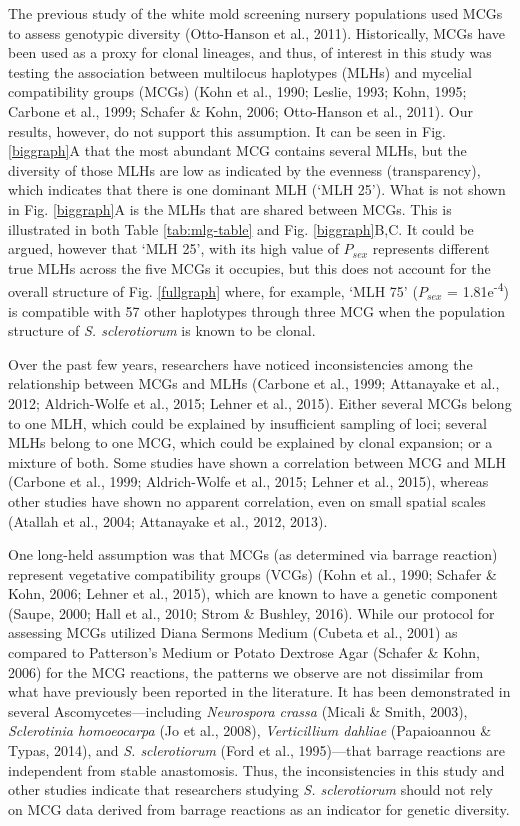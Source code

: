 The previous study of the white mold screening nursery populations used
MCGs to assess genotypic diversity (Otto-Hanson et al., 2011).
Historically, MCGs have been used as a proxy for clonal lineages, and
thus, of interest in this study was testing the association between
multilocus haplotypes (MLHs) and mycelial compatibility groups (MCGs)
(Kohn et al., 1990; Leslie, 1993; Kohn, 1995; Carbone et al., 1999;
Schafer \& Kohn, 2006; Otto-Hanson et al., 2011). Our results, however,
do not support this assumption. It can be seen in Fig. \ref{biggraph}A
that the most abundant MCG contains several MLHs, but the diversity of
those MLHs are low as indicated by the evenness (transparency), which
indicates that there is one dominant MLH (`MLH 25'). What is not shown
in Fig. \ref{biggraph}A is the MLHs that are shared between MCGs. This
is illustrated in both Table \ref{tab:mlg-table} and Fig.
\ref{biggraph}B,C. It could be argued, however that `MLH 25', with its
high value of \(P_{sex}\) represents different true MLHs across the five
MCGs it occupies, but this does not account for the overall structure of
Fig. \ref{fullgraph} where, for example, `MLH 75' (\(P_{sex}\) =
1.81e\textsuperscript{-4}) is compatible with 57 other haplotypes
through three MCG when the population structure of \emph{S.
sclerotiorum} is known to be clonal.

Over the past few years, researchers have noticed inconsistencies among
the relationship between MCGs and MLHs (Carbone et al., 1999; Attanayake
et al., 2012; Aldrich-Wolfe et al., 2015; Lehner et al., 2015). Either
several MCGs belong to one MLH, which could be explained by insufficient
sampling of loci; several MLHs belong to one MCG, which could be
explained by clonal expansion; or a mixture of both. Some studies have
shown a correlation between MCG and MLH (Carbone et al., 1999;
Aldrich-Wolfe et al., 2015; Lehner et al., 2015), whereas other studies
have shown no apparent correlation, even on small spatial scales
(Atallah et al., 2004; Attanayake et al., 2012, 2013).

One long-held assumption was that MCGs (as determined via barrage
reaction) represent vegetative compatibility groups (VCGs) (Kohn et al.,
1990; Schafer \& Kohn, 2006; Lehner et al., 2015), which are known to
have a genetic component (Saupe, 2000; Hall et al., 2010; Strom \&
Bushley, 2016). While our protocol for assessing MCGs utilized Diana
Sermons Medium (Cubeta et al., 2001) as compared to Patterson's Medium
or Potato Dextrose Agar (Schafer \& Kohn, 2006) for the MCG reactions,
the patterns we observe are not dissimilar from what have previously
been reported in the literature. It has been demonstrated in several
Ascomycetes---including \emph{Neurospora crassa} (Micali \& Smith,
2003), \emph{Sclerotinia homoeocarpa} (Jo et al., 2008),
\emph{Verticillium dahliae} (Papaioannou \& Typas, 2014), and \emph{S.
sclerotiorum} (Ford et al., 1995)---that barrage reactions are
independent from stable anastomosis. Thus, the inconsistencies in this
study and other studies indicate that researchers studying \emph{S.
sclerotiorum} should not rely on MCG data derived from barrage reactions
as an indicator for genetic diversity.

